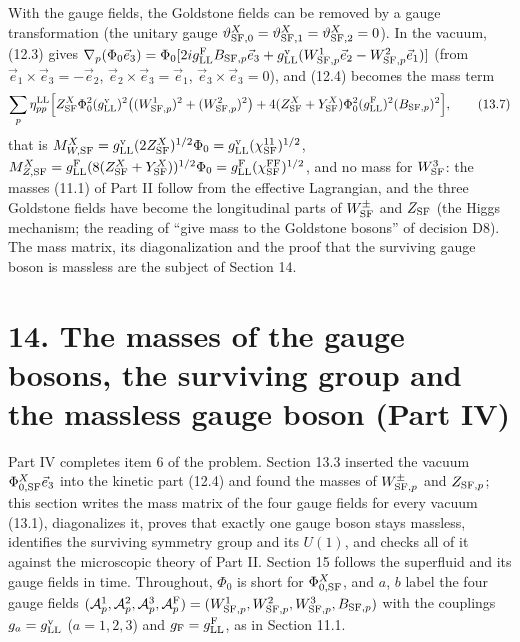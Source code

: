 \documentclass[
  10pt,
]{article}
\begin{document}
With the gauge fields, the Goldstone fields can be removed by a gauge
transformation (the unitary gauge
\(\vartheta^X_{{\rm SF},0}=\vartheta^X_{{\rm SF},1}=\vartheta^X_{{\rm SF},2}=0\)).
In the vacuum, (12.3) gives
\(\nabla_p(\Phi_0\vec e_3)=\Phi_0[2ig^{\rm F}_{\rm LL}B_{{\rm SF},p}\vec e_3+g^{\rm v}_{\rm LL}(W^1_{{\rm SF},p}\vec e_2-W^2_{{\rm SF},p}\vec e_1)]\)
(from \(\vec e_1\times\vec e_3=-\vec e_2\),
\(\vec e_2\times\vec e_3=\vec e_1\), \(\vec e_3\times\vec e_3=0\)), and
(12.4) becomes the mass term
\[\sum_p\eta^{\rm LL}_{pp}\Big[Z^X_{\rm SF}\Phi_0^2(g^{\rm v}_{\rm LL})^2\big((W^1_{{\rm SF},p})^2+(W^2_{{\rm SF},p})^2\big)+4(Z^X_{\rm SF}+Y^X_{\rm SF})\Phi_0^2(g^{\rm F}_{\rm LL})^2(B_{{\rm SF},p})^2\Big],\tag{13.7}\]
that is
\(M^X_{W,{\rm SF}}=g^{\rm v}_{\rm LL}(2Z^X_{\rm SF})^{1/2}\Phi_0=g^{\rm v}_{\rm LL}(\chi^{11}_{\rm SF})^{1/2}\),
\(M^X_{Z,{\rm SF}}=g^{\rm F}_{\rm LL}(8(Z^X_{\rm SF}+Y^X_{\rm SF}))^{1/2}\Phi_0=g^{\rm F}_{\rm LL}(\chi^{\rm FF}_{\rm SF})^{1/2}\),
and no mass for \(W^3_{\rm SF}\): the masses (11.1) of Part II follow
from the effective Lagrangian, and the three Goldstone fields have
become the longitudinal parts of \(W^\pm_{\rm SF}\) and \(Z_{\rm SF}\)
(the Higgs mechanism; the reading of ``give mass to the Goldstone
bosons'' of decision D8). The mass matrix, its diagonalization and the
proof that the surviving gauge boson is massless are the subject of
Section 14.

\hypertarget{the-masses-of-the-gauge-bosons-the-surviving-group-and-the-massless-gauge-boson-part-iv}{%
\section{14. The masses of the gauge bosons, the surviving group and the
massless gauge boson (Part
IV)}\label{the-masses-of-the-gauge-bosons-the-surviving-group-and-the-massless-gauge-boson-part-iv}}

Part IV completes item 6 of the problem. Section 13.3 inserted the
vacuum \(\Phi^X_{0,{\rm SF}}\vec e_3\) into the kinetic part (12.4) and
found the masses of \(W^\pm_{{\rm SF},p}\) and \(Z_{{\rm SF},p}\); this
section writes the mass matrix of the four gauge fields for every vacuum
(13.1), diagonalizes it, proves that exactly one gauge boson stays
massless, identifies the surviving symmetry group and its \(U(1)\), and
checks all of it against the microscopic theory of Part II. Section 15
follows the superfluid and its gauge fields in time. Throughout,
\(\Phi_0\) is short for \(\Phi^X_{0,{\rm SF}}\), and \(a\), \(b\) label
the four gauge fields
\((\mathcal A^1_p,\mathcal A^2_p,\mathcal A^3_p,\mathcal A^{\rm F}_p)=(W^1_{{\rm SF},p},W^2_{{\rm SF},p},W^3_{{\rm SF},p},B_{{\rm SF},p})\)
with the couplings \(g_a=g^{\rm v}_{\rm LL}\) (\(a=1,2,3\)) and
\(g_{\rm F}=g^{\rm F}_{\rm LL}\), as in Section 11.1.
\end{document}
